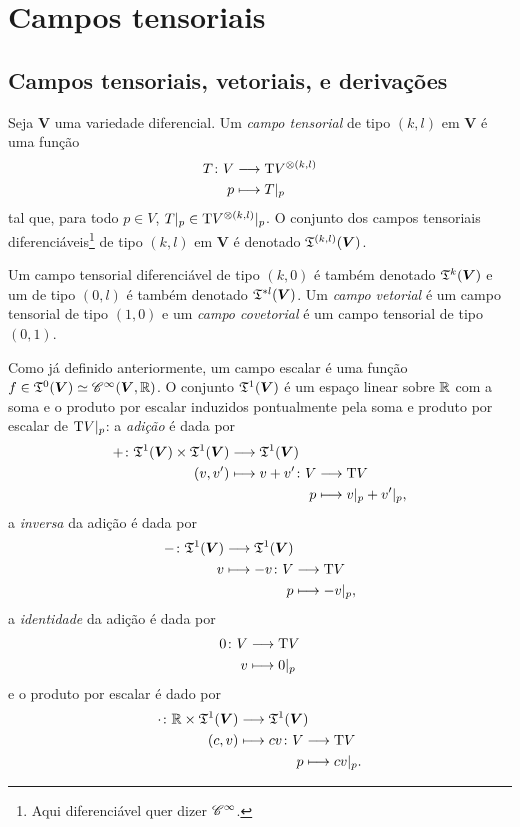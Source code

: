 \section{Campos tensoriais}

\subsection{Campos tensoriais, vetoriais, e derivações}

\begin{definition}
Seja $\bm V$ uma variedade diferencial. Um \emph{campo tensorial} de tipo $(k,l)$ em $\bm V$ é uma função
	\begin{align*}
	{T}\colon {V} &\longrightarrow {\mathrm{T}V^{\otimes(k,l)}} \\{p} &\longmapsto T|_p
	\end{align*}
tal que, para todo $p \in V$, $T|_p \in \mathrm{T} V^{\otimes(k,l)}|_p$. O conjunto dos campos tensoriais diferenciáveis\footnote{Aqui diferenciável quer dizer $\mathscr{C}^\infty$.} de tipo $(k,l)$ em $\bm V$ é denotado $\mathfrak{T}^{(k,l)}(\bm V)$.

Um campo tensorial diferenciável de tipo $(k,0)$ é também denotado $\mathfrak{T}^k(\bm V)$ e um de tipo $(0,l)$ é também denotado $\mathfrak{T}^{* l}(\bm V)$.
Um \emph{campo vetorial} é um campo tensorial de tipo $(1,0)$ e um \emph{campo covetorial} é um campo tensorial de tipo $(0,1)$.
\end{definition}

Como já definido anteriormente, um campo escalar é uma função $f \in \mathfrak{T}^0(\bm V) \simeq \mathscr{C}^{\infty}(\bm V,\mathbb{R})$. O conjunto $\mathfrak{T}^1(\bm V)$ é um espaço linear sobre $\mathbb{R}$ com a soma e o produto por escalar induzidos pontualmente pela soma e produto por escalar de $\mathrm{T} V|_p$: a \emph{adição} é dada por
	\begin{align*}
	\func{+}{\tens^1(\bm V) \times \tens^1(\bm V)}{\tens^1(\bm V)}{(v,v')}{
		\begin{aligned}[t]
		\func{v+v'}{V}{\Tg V}{p}{v|_p + v'|_p},
		\end{aligned}
	}
	\end{align*}
a \emph{inversa} da adição é dada por
	\begin{align*}
	\func{-}{\tens^1(\bm V)}{\tens^1(\bm V)}{v}{
		\begin{aligned}[t]
			\func{-v}{V}{\Tg V}{p}{-v|_p},
		\end{aligned}
	}
	\end{align*}
a \emph{identidade} da adição é dada por
	\begin{align*}
	\func{0}{V}{\Tg V}{v}{0|_p}
	\end{align*}
e o produto por escalar é dado por
	\begin{align*}
	\func{\cdot}{\R \times \tens^1(\bm V)}{\tens^1(\bm V)}{(c,v)}{
		\begin{aligned}[t]
		\func{cv}{V}{\Tg V}{p}{cv|_p.}
		\end{aligned}
	}
	\end{align*}

